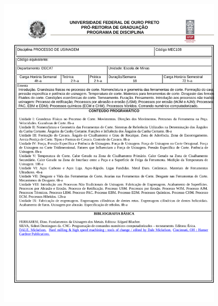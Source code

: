 \begin{figure}[p]
	\centering 
	\includegraphics[scale=0.7]{capitulos/anexo1-programas-disciplina/eg314.pdf}
\end{figure}

